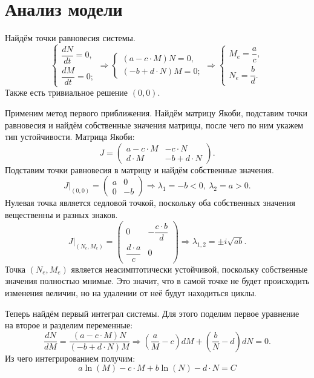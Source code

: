 \section{Анализ модели}
    Найдём точки равновесия системы.
    \[
        \begin{cases}
            \dfrac{dN}{dt} = 0, \\[.5em]
            \dfrac{dM}{dt} = 0;
        \end{cases}
        \Rightarrow
        \begin{cases}
            (a - c \cdot M) N = 0, \\[.5em]
            (-b + d \cdot N) M = 0;
        \end{cases}
        \Rightarrow
        \begin{cases}
            M_e = \dfrac{a}{c}, \\[.5em]
            N_e = \dfrac{b}{d}.
        \end{cases}
    \]
    Также есть тривиальное решение $ (0, 0) $.

    Применим метод первого приближения. Найдём матрицу Якоби, подставим точки равновесия и найдём собственные значения матрицы, после чего по ним укажем тип устойчивости.
    Матрица Якоби:
    \[
        J = \left(\begin{matrix}
            a - c \cdot M & -c \cdot N \\
            d \cdot M & -b + d \cdot N
        \end{matrix}\right).
    \]
    Подставим точки равновесия в матрицу и найдём собственные значения.
    \[
        J\big|_{(0,0)} = \left(\begin{matrix}
            a & 0\\
            0 & -b
        \end{matrix}\right)
        \Rightarrow
        \lambda_1 = -b < 0, ~ \lambda_2 = a > 0.
    \]
    Нулевая точка является седловой точкой, поскольку оба собственных значения вещественны и разных знаков.
    \[
        J\big|_{(N_e,M_e)} = \left(\begin{matrix}
            0 & -\dfrac{c \cdot b}{d}\\
            \dfrac{d \cdot a}{c} & 0
        \end{matrix}\right)
        \Rightarrow
        \lambda_{1,2} = \pm i \sqrt{ab}.
    \]
    Точка $ (N_e, M_e) $ является неасимптотически устойчивой, поскольку собственные значения полностью мнимые. Это значит, что в самой точке не будет происходить изменения величин, но на удалении от неё будут находиться циклы.

    Теперь найдём первый интеграл системы. Для этого поделим первое уравнение на второе и разделим переменные:
    \[
        \frac{dN}{dM} = \frac{(a - c \cdot M)N}{(-b + d \cdot N)M} \Rightarrow
        \left( \frac{a}{M} - c \right)dM + \left( \frac{b}{N} - d \right)dN = 0.
    \]
    Из чего интегрированием получим:
    \[
        a \ln(M) - c \cdot M + b \ln(N) - d \cdot N = C
    \]